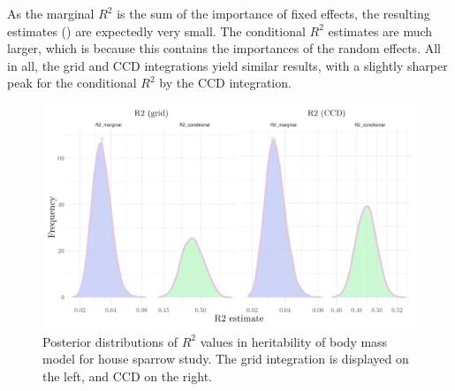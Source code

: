 As the marginal $R^2$ is the sum of the importance of fixed effects, the resulting estimates () are expectedly very small. The conditional $R^2$ estimates are much larger, which is because this contains the importances of the random effects. All in all, the grid and CCD integrations yield similar results, with a slightly sharper peak for the conditional $R^2$ by the CCD integration. 
\begin{figure}[H]%
  \centering
  \includegraphics[width=1\linewidth]{Figures/House sparrow study/Mass_r2.png}
  \caption[Posterior distributions of $R^2$ values in body mass model for house sparrow study]{Posterior distributions of $R^2$ values in heritability of body mass model for house sparrow study. The grid integration is displayed on the left, and CCD on the right.}
  \label{fig:mass_r2}
\end{figure}

